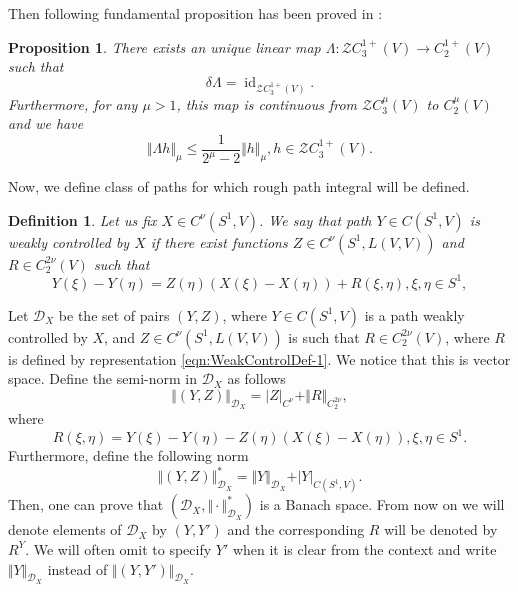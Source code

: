 \documentclass[11pt,a4paper,leqno]{amsart}%
\theoremstyle{plain}
\theoremstyle{remark}
\theoremstyle{plain}
\newtheorem{proposition}[theorem]{Proposition}
\newtheorem{definition}[theorem]{Definition}
\numberwithin{equation}{section}
\newcommand\id{\operatorname{id}}
\def\Rnu{{\mathbb R}}
\begin{document}
Then following fundamental proposition has been proved in
\cite{[Gubinelli-2004]}:
\begin{proposition}
There exists an unique linear map
$\Lambda:\mathcal{Z}C_3^{1+}(V)\to C_2^{1+}(V)$ such that
$$
\delta\Lambda=\id_{\mathcal{Z}C_3^{1+}(V)}.
$$
Furthermore, for any $\mu>1$, this map is continuous from
$\mathcal{Z}C_3^{\mu}(V)$ to $C_2^{\mu}(V)$ and we have
$$
\Vert \Lambda h\Vert_{\mu}\leq
\frac{1}{2^{\mu}-2}\Vert h\Vert_{\mu},h\in\mathcal{Z}C_3^{1+}(V).
$$
\end{proposition}
Now, we define class of paths for which rough path integral will
be defined.
\begin{definition}
Let us fix $X\in C^{\nu}(S^1,V)$. %
We say that path $Y\in C(S^1,V)$ is weakly controlled by $X$ if
there exist functions $Z\in C^{\nu}(S^1,L(V,V))$ and $R\in
C_2^{2\nu}(V)$ such that
\begin{equation}
Y(\xi)-Y(\eta) =Z(\eta)(X(\xi)-X(\eta))+R(\xi,\eta),\xi,\eta\in
S^1,\label{eqn:WeakControlDef-1}
\end{equation}
\end{definition}
Let $\mathcal{D}_X$ be the set of pairs $(Y,Z)$, where $Y\in
C(S^1,V)$ is a path weakly controlled by $X$, and $Z\in
C^{\nu}(S^1,L(V,V))$ is such that $R\in C_2^{2\nu}(V)$, where $R$
is defined by representation \eqref{eqn:WeakControlDef-1}. We
notice that this is vector space. Define the semi-norm in
$\mathcal{D}_X$ as follows
\begin{equation}
\Vert (Y,Z)\Vert_{\mathcal{D}_X}=\vert Z\vert_{C^{\nu}}+\Vert R\Vert_{C_2^{2\nu}},\label{eqn:D_XNorm-1}
\end{equation}
where
\begin{equation}
R(\xi,\eta)=Y(\xi)-Y(\eta)-Z(\eta)(X(\xi)-X(\eta)),\xi,\eta\in
S^1.\label{eqn:WeakControlDef-1'}
\end{equation}
Furthermore, define the following norm
\begin{equation}
\Vert (Y,Z)\Vert_{\mathcal{D}_X}^*=\Vert Y\Vert_{\mathcal{D}_X}+\vert Y\vert_{C(S^1,V)}.\label{eqn:D_XNorm-2}
\end{equation}
Then, one can prove that
$(\mathcal{D}_X,\Vert \cdot\Vert_{\mathcal{D}_X}^*)$ is a Banach space.
From now on we will denote elements of $\mathcal{D}_X$ by $(Y,Y')$
and the corresponding $R$ will be denoted by $R^Y$. We will often
omit to specify $Y'$ when it is clear from the context and write
$\Vert Y\Vert_{\mathcal{D}_X}$ instead of $\Vert (Y,Y')\Vert_{\mathcal{D}_X}$.
\end{document}
